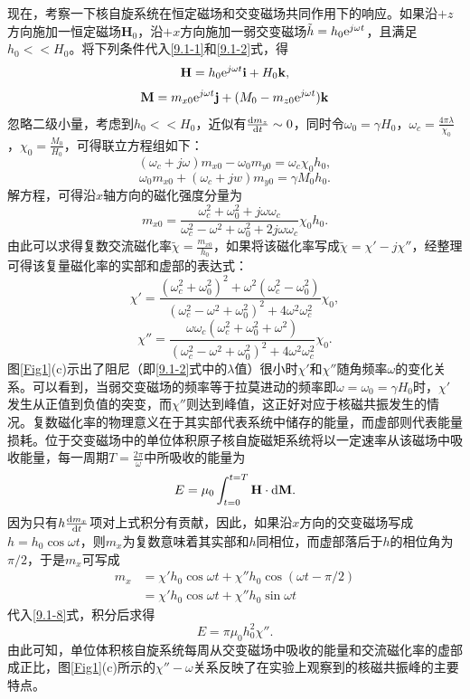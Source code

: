 \documentclass{buaaemp}
\begin{document}
现在，考察一下核自旋系统在恒定磁场和交变磁场共同作用下的响应。如果沿$+z$方向施加一恒定磁场$\mathbf{H}_0$，沿$+x$方向施加一弱交变磁场$\tilde{h}=h_0{\rm e}^{j\omega t}$，且满足$h_0<<H_0$。将下列条件代入\ref{9.1-1}和\ref{9.1-2}式，得
$$\mathbf{H}=h_0{\rm e}^{j\omega t}\mathbf{i}+H_0\mathbf{k},$$
$$\mathbf{M}=m_{x0}{\rm e}^{j\omega t}\mathbf{j}+(M_0-m_{z0}{\rm e}^{j\omega t})\mathbf{k}$$
忽略二级小量，考虑到$h_0<<H_0$，近似有$\frac{{\rm d}m_z}{{\rm d}t}\sim0$，同时令$\omega_0=\gamma H_0$，$\omega_c=\frac{4\pi\lambda}{\chi_0}$，$\chi_0=\frac{M_0}{H_0}$，可得联立方程组如下：
\begin{equation}(\omega_c+j\omega)m_{x0}-\omega_0m_{y0}=\omega_c\chi_0h_0,\label{9.1-5}\end{equation}
\begin{equation}\omega_0m_{x0}+(\omega_c+jw)m_{y0}=\gamma M_0h_0.\label{9.1-6}\end{equation}
解方程，可得沿$x$轴方向的磁化强度分量为
\begin{equation}m_{x0}=\frac{\omega_c^2+\omega_0^2+j\omega\omega_c}{\omega_c^2-\omega^2+\omega_0^2+2j\omega\omega_c}\chi_0h_0.\label{9.1-7}\end{equation}
由此可以求得复数交流磁化率$\tilde{\chi}=\frac{m_{x0}}{h_0}$，如果将该磁化率写成$\tilde{\chi}=\chi'-j\chi''$，经整理可得该复量磁化率的实部和虚部的表达式：
\begin{equation}\chi'=\frac{(\omega_c^2+\omega_0^2)^2+\omega^2(\omega_c^2-\omega_0^2)}{(\omega_c^2-\omega^2+\omega_0^2)^2+4\omega^2\omega_c^2}\chi_0,\label{9.1-8}\end{equation}
\begin{equation}\chi''=\frac{\omega\omega_c(\omega_c^2+\omega_0^2+\omega^2)}{(\omega_c^2-\omega^2+\omega_0^2)^2+4\omega^2\omega_c^2}\chi_0.\label{9.1-9}\end{equation}
图\ref{Fig1}(c)示出了阻尼（即\ref{9.1-2}式中的$\lambda$值）很小时$\chi'$和$\chi''$随角频率$\omega$的变化关系。可以看到，当弱交变磁场的频率等于拉莫进动的频率即$\omega=\omega_0=\gamma H_0$时，$\chi'$发生从正值到负值的突变，而$\chi''$则达到峰值，这正好对应于核磁共振发生的情况。复数磁化率的物理意义在于其实部代表系统中储存的能量，而虚部则代表能量损耗。位于交变磁场中的单位体积原子核自旋磁矩系统将以一定速率从该磁场中吸收能量，每一周期$T=\frac{2\pi}{\omega}$中所吸收的能量为
\begin{equation}E=\mu_0\int_{t=0}^{t=T}\mathbf{H}\cdot{\rm d}\mathbf{M}.\label{9.1-10}\end{equation}
因为只有$h\frac{{\rm d}m_x}{{\rm d}t}$项对上式积分有贡献，因此，如果沿$x$方向的交变磁场写成$h=h_0\cos\omega t$，则$m_x$为复数意味着其实部和$h$同相位，而虚部落后于$h$的相位角为$\pi/2$，于是$m_x$可写成
\begin{align*}
    m_x&=\chi'h_0\cos\omega t+\chi''h_0\cos(\omega t-\pi/2)\\
    &=\chi'h_0\cos\omega t+\chi''h_0\sin\omega t
\end{align*}
代入\ref{9.1-8}式，积分后求得
\begin{equation}E=\pi\mu_0h_0^2\chi''.\label{9.1-11}\end{equation}
由此可知，单位体积核自旋系统每周从交变磁场中吸收的能量和交流磁化率的虚部成正比，图\ref{Fig1}(c)所示的$\chi''-\omega$关系反映了在实验上观察到的核磁共振峰的主要特点。
\end{document}
